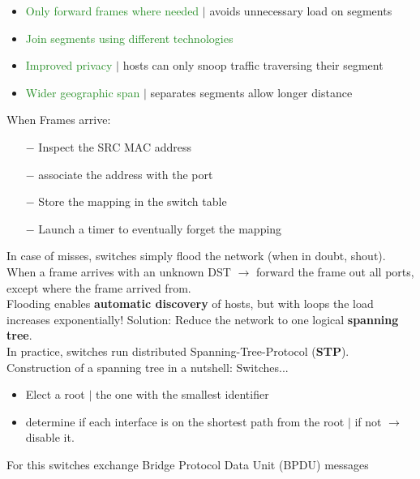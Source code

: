 \documentclass[a4paper, fontsize=8pt, landscape, DIV=1]{scrartcl}
\begin{document}
\begin{multicols*}{4}
\begin{itemize}[noitemsep]
\begin{itemize}
   					\item \textcolor{ForestGreen}{Only forward frames where needed} $\vert$ avoids unnecessary load on segments
   					\item \textcolor{ForestGreen}{Join segments using different technologies}
   					\item \textcolor{ForestGreen}{Improved privacy} $\vert$ hosts can only snoop traffic traversing their segment
   					\item \textcolor{ForestGreen}{Wider geographic span} $\vert$ separates segments allow longer distance
   				\end{itemize} 
   			\end{itemize}
   			\newpage
   			
   			When Frames arrive:
   			\vspace{-0.2cm} 
   			\begin{itemize}[noitemsep]
   				\item [$-$] Inspect the SRC MAC address
   				\item [$-$] associate the address with the port
   				\item [$-$] Store the mapping in the switch table
   				\item [$-$] Launch a timer to eventually forget the mapping
   			\end{itemize}
   		In case of misses, switches simply flood the network (when in doubt, shout).\\
   		When a frame arrives with an unknown DST $\rightarrow$ forward the frame out all ports, except where the frame arrived from.\\ 
   		Flooding enables \textbf{automatic discovery} of hosts, but with loops the load increases exponentially! Solution: Reduce the network to one logical \textbf{spanning tree}.\\
   		In practice, switches run distributed Spanning-Tree-Protocol (\textbf{STP}). \\
   		Construction of a spanning tree in a nutshell: Switches...
   		\begin{itemize}[noitemsep]
   			\item Elect a root $\vert$ the one with the smallest identifier
   			\item determine if each interface is on the shortest path from the root $\vert$ if not $\rightarrow$ disable it.
   		\end{itemize}
   		For this switches exchange Bridge Protocol Data Unit (BPDU) messages\\

\end{multicols*}
\end{document}
